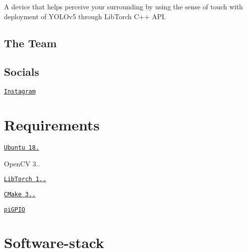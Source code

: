 A device that helps perceive your surrounding by using the sense of touch with deployment of Y\+O\+L\+Ov5 through Lib\+Torch C++ A\+PI.



\subsection*{The Team}


\begin{DoxyItemize}
\item \href{https://github.com/rdj2829}{\tt }
\item \href{https://github.com/dheerajsankar}{\tt }
\item \href{https://github.com/kprakz}{\tt }
\item \href{https://github.com/josephjoel3099}{\tt }
\end{DoxyItemize}

\subsection*{Socials}


\begin{DoxyItemize}
\item \href{https://www.instagram.com/hapticvision_/}{\tt Instagram}
\end{DoxyItemize}

\section*{Requirements}


\begin{DoxyItemize}
\item \href{https://www.instructables.com/Install-Ubuntu-18044-LTS-on-Your-Raspberry-Pi-Boar/}{\tt Ubuntu 18.}
\item Open\+CV 3..
\item \href{https://download.pytorch.org/libtorch/nightly/cpu/libtorch-shared-with-deps-latest.zip}{\tt Lib\+Torch 1..}
\item \href{https://askubuntu.com/questions/355565/how-do-i-install-the-latest-version-of-cmake-from-the-command-line}{\tt C\+Make 3..}
\item \href{https://abyz.me.uk/rpi/pigpio/download.html}{\tt pi\+G\+P\+IO}
\end{DoxyItemize}

\section*{Software-\/stack}

